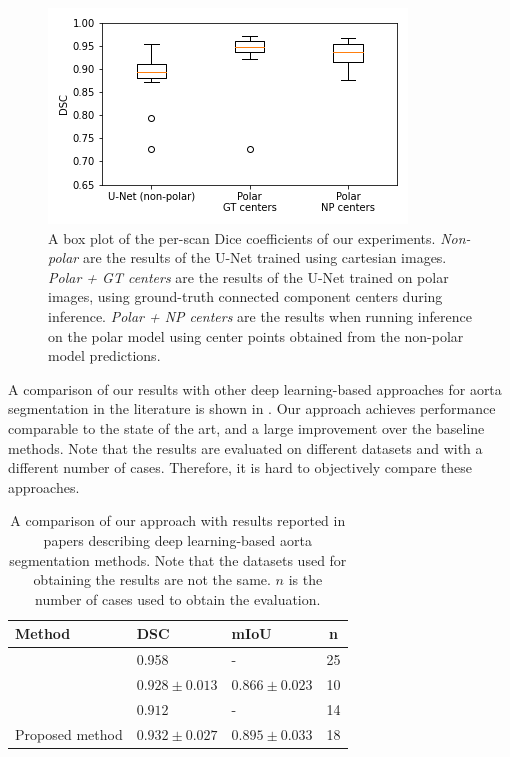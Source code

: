 \begin{figure}[t!]
\centering
\includegraphics[width=0.6\columnwidth]{images/4/box_plot}
\caption{A box plot of the per-scan Dice coefficients of our experiments. \textit{Non-polar} are the results of the U-Net trained using cartesian images. \textit{Polar + GT centers} are the results of the U-Net trained on polar images, using ground-truth connected component centers during inference. \textit{Polar + NP centers} are the results when running inference on the polar model using center points obtained from the non-polar model predictions. \cite{bencevicUsingPolarTransform2022a}}
\label{fig:box}
\end{figure}

A comparison of our results with other deep learning-based approaches for aorta segmentation in the literature is shown in . Our approach achieves performance comparable to the state of the art, and a large improvement over the baseline methods. Note that the results are evaluated on different datasets and with a different number of cases. Therefore, it is hard to objectively compare these approaches.

\begin{table}[t!]
\def\arraystretch{1.25}
\centering
\begin{tabularx}{\textwidth}{X l l c}
 \textbf{Method} & \textbf{DSC} & \textbf{mIoU} & \textbf{n}\\ 
 \hline
\citet{yuThreeDimensionalDeepConvolutional2021} & 0.958 & - & 25 \\
\citet{fantazzini3DAutomaticSegmentation2020} & $0.928 \pm 0.013$ & $0.866 \pm 0.023$ & 10 \\
\citet{cheungComputationallyEfficientApproach2021} & $0.912$ & - & 14 \\
Proposed method & $0.932 \pm 0.027$ & $0.895 \pm 0.033$ & 18 \\
\end{tabularx}
\caption{A comparison of our approach with results reported in papers describing deep learning-based aorta segmentation methods. Note that the datasets used for obtaining the results are not the same. $n$ is the number of cases used to obtain the evaluation.}
\label{table:comparison}
\end{table}

